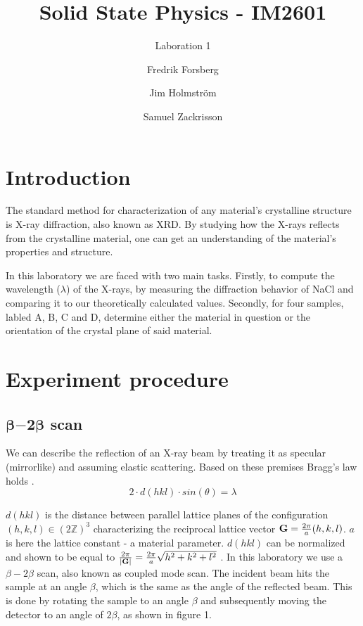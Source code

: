 \documentclass[a4paper,twoside=false,abstract=false,numbers=noenddot,
titlepage=false,headings=small,parskip=half,version=last]{scrartcl}
\title{Solid State Physics - IM2601}
\subtitle{Laboration 1}
\author[1]{Fredrik Forsberg}
\author[1]{Jim Holmström}
\author[1]{Samuel Zackrisson}
\affil[1]{Engineering Physics, Royal Institute of Technology}
\affil[1]{\{fforsber, jimho, samuelz\}@kth.se}
\begin{document}
\maketitle
\thispagestyle{empty}

\section{Introduction}
The standard method for characterization of any material's crystalline structure is X-ray diffraction, also known as XRD.
By studying how the X-rays reflects from the crystalline material, one can get an understanding of the material's properties and structure.

In this laboratory we are faced with two main tasks.
Firstly, to compute the wavelength ($\lambda$) of the X-rays, by measuring the diffraction behavior of NaCl and comparing it to our theoretically calculated values.
Secondly, for four samples, labled A, B, C and D, determine either the material in question or the orientation of the crystal plane of said material.

\section{Experiment procedure}
\subsection{$\boldsymbol{\beta}\boldsymbol{-}\boldsymbol{2}\boldsymbol{\beta}$ scan}
We can describe the reflection of an X-ray beam by treating it as specular (mirrorlike) and assuming elastic scattering. Based on these premises Bragg's law holds \cite{Kittel}.
\begin{equation}
    \label{eq:braggs}
    2 \cdot d(hkl) \cdot sin( \theta ) = \lambda
\end{equation}

$d(hkl)$ is the distance between parallel lattice planes of the configuration $(h,k,l)\in \left(2 \mathbb{Z}\right)^3$
characterizing the reciprocal lattice vector $\bold{G}=\frac{2\pi}{a}(h,k,l)$. $a$ is here the lattice constant - a material parameter.
$d(hkl)$ can be normalized and shown to be equal to $\frac{2\pi}{\left\vert \bold{G} \right\vert} = \frac{2\pi}{a}\sqrt{h^2+k^2+l^2}$ \cite{Kittel}.
In this laboratory we use a $\beta-2\beta$ scan, also known as coupled mode scan.
The incident beam hits the sample at an angle $\beta$, which is the same as the angle of the reflected beam.
This is done by rotating the sample to an angle $\beta$ and subsequently moving the detector to an angle of $2\beta$, as shown in figure 1.
\end{document}

